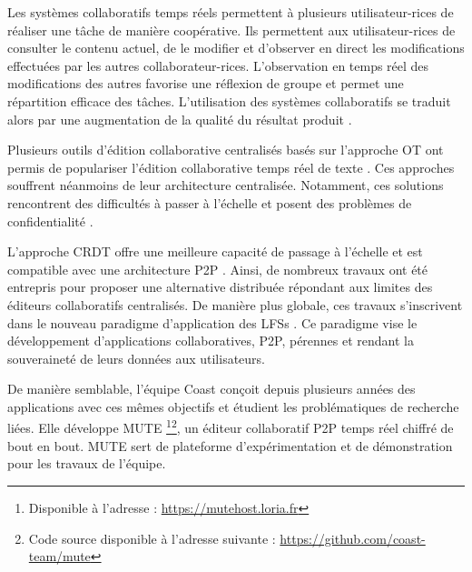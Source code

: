 Les systèmes collaboratifs temps réels permettent à plusieurs utilisateur-rices de réaliser une tâche de manière coopérative.
Ils permettent aux utilisateur-rices de consulter le contenu actuel, de le modifier et d'observer en direct les modifications effectuées par les autres collaborateur-rices.
L'observation en temps réel des modifications des autres favorise une réflexion de groupe et permet une répartition efficace des tâches.
L'utilisation des systèmes collaboratifs se traduit alors par une augmentation de la qualité du résultat produit \cite{2004-empirical-study-collaborative-writing, 2005-internet-encyclopaedias-head-to-head}.

Plusieurs outils d'édition collaborative centralisés basés sur l'approche \acf{OT} \cite{1989-grove-ellis-gibbs} ont permis de populariser l'édition collaborative temps réel de texte \cite{gdocs, etherpad}.
Ces approches souffrent néanmoins de leur architecture centralisée.
Notamment, ces solutions rencontrent des difficultés à passer à l'échelle \cite{2015-cope-delay-collaborative-note-taking-ignat, 2016-performance-collaborative-editors-dang-ignat} et posent des problèmes de confidentialité \cite{prism-washington-post, prism-guardian}.

L'approche \ac{CRDT} offre une meilleure capacité de passage à l'échelle et est compatible avec une architecture \ac{P2P} \cite{2011-evaluation-crdts-ahmed-nacer}.
Ainsi, de nombreux travaux \cite{Nedelec2016CRATE, peerpad, serenity-notes} ont été entrepris pour proposer une alternative distribuée répondant aux limites des éditeurs collaboratifs centralisés.
De manière plus globale, ces travaux s'inscrivent dans le nouveau paradigme d'application des \acfp{LFS} \cite{localfirstsoftware2019, pushpin2020}.
Ce paradigme vise le développement d'applications collaboratives, \ac{P2P}, pérennes et rendant la souveraineté de leurs données aux utilisateurs.\\


De manière semblable, l'équipe Coast conçoit depuis plusieurs années des applications avec ces mêmes objectifs et étudient les problématiques de recherche liées.
Elle développe \acf{MUTE} \cite{MUTE2017}\footnote{Disponible à l'adresse : \url{https://mutehost.loria.fr}}\footnote{Code source disponible à l'adresse suivante : \url{https://github.com/coast-team/mute}}, un éditeur collaboratif \ac{P2P} temps réel chiffré de bout en bout.
\ac{MUTE} sert de plateforme d'expérimentation et de démonstration pour les travaux de l'équipe.

